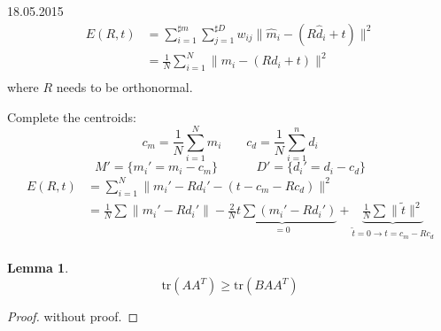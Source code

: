 \documentclass[a4paper,10pt,ngerman]{article}
\newtheorem{lemma}{Lemma}
\newcommand{\trace}[1]{\text{tr}\left(#1\right)}
\begin{document}
\begin{section}{18.05.2015}
 \begin{align*}
  E(R,t) &= \sum_{i=1}^{\sharp m} \sum_{j=1}^{\sharp D} w_{ij} \| \hat{m}_i - (R\hat{d}_i + t )\|^2 \\
  &= \frac{1}{N} \sum_{i=1}^N \| m_i - (Rd_i +t)\|^2 \\
 \end{align*}
 where $R$ needs to be orthonormal.
 
 Complete the centroids:
 \[ c_m = \frac{1}{N}\sum_{i=1}^N m_i ~~~~~~~~~ c_d = \frac{1}{N}\sum_{i=1}^n d_i \]
 \[ M' = \{ m_i' = m_i - c_m \} ~~~~~~~~~~~~~~ D' = \{ d_i' = d_i - c_d \} \]
 \begin{align*}
  E(R,t) &= \sum_{i=1}^N \|m_i' - Rd_i' - (t-c_m-Rc_d)\|^2 \\
  &= \frac{1}{N} \sum \| m_i'-Rd_i'\| - \underbrace{\frac{2}{N} t \sum (m_i'-Rd_i')}_{=0} + \underbrace{\frac{1}{N}\sum \|\tilde{t} \|^2}_{\tilde{t} = 0 \rightarrow t = c_m -Rc_d} \\  
 \end{align*}
 
 \begin{lemma} \label{lemma1}
  \[ \trace{AA^T} \geq \trace{BAA^T}\]
 \end{lemma}
 \begin{proof}
  without proof.
 \end{proof}



\end{section}
\end{document}
